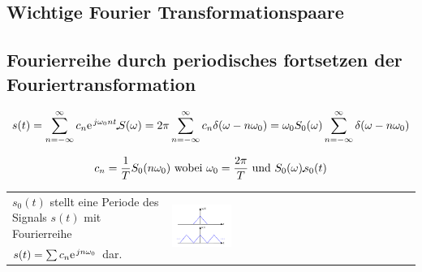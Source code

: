 \subsection{Wichtige Fourier Transformationspaare}

  
  
\subsection{Fourierreihe durch periodisches fortsetzen der Fouriertransformation}
\[
s(t) = \sum\limits_{n=-\infty}^{\infty} c_n \e^{j\omega_0 n t} \FT S(\omega) = 2\pi \sum\limits_{n=-\infty}^{\infty}c_n \delta(\omega - n\omega_0)
= \omega_0 S_0(\omega) \sum\limits_{n=-\infty}^{\infty} \delta(\omega-n\omega_0)
\] 

\[
c_n = \frac{1}{T}S_0(n\omega_0) \text{ wobei } \omega_0 = \frac{2\pi}{T} \text{ und } S_0(\omega) \IFT s_0(t)
\]

\begin{tabular}{L{9cm}C{9cm}}
$s_0(t)$ stellt eine Periode des Signals $s(t)$ mit Fourierreihe
&  \\
$s(t) = \sum c_n \e^{jn\omega_0}$ dar. & \\
\end{tabular}	
